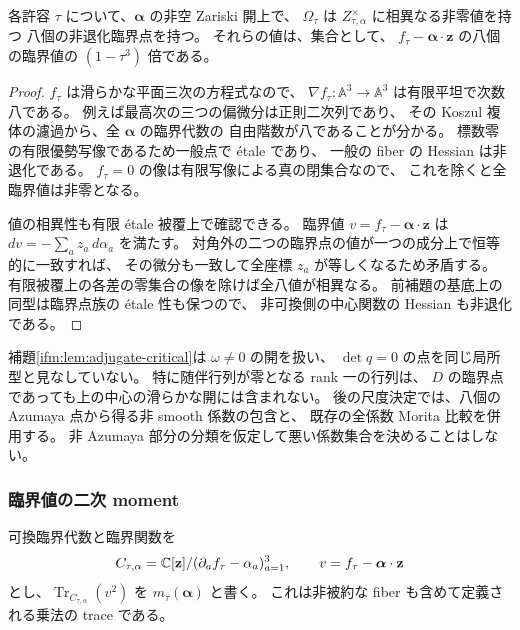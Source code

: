 \begin{corollary}
\label{ifm:cor:eight-morse}
各許容 $\tau$ について、$\boldsymbol\alpha$ の非空 Zariski 開上で、
$\Omega_\tau$ は $Z_{\tau,\alpha}^{\times}$ に相異なる非零値を持つ
八個の非退化臨界点を持つ。
それらの値は、集合として、
$f_\tau-\boldsymbol\alpha\cdot\mathbf z$ の八個の臨界値の
$(1-\tau^3)$ 倍である。
\end{corollary}

\begin{proof}
$f_\tau$ は滑らかな平面三次の方程式なので、
$\nabla f_\tau:\mathbb A^3\to\mathbb A^3$ は有限平坦で次数八である。
例えば最高次の三つの偏微分は正則二次列であり、
その Koszul 複体の濾過から、全 $\boldsymbol\alpha$ の臨界代数の
自由階数が八であることが分かる。
標数零の有限優勢写像であるため一般点で \'etale であり、
一般の fiber の Hessian は非退化である。
$f_\tau=0$ の像は有限写像による真の閉集合なので、
これを除くと全臨界値は非零となる。

値の相異性も有限 \'etale 被覆上で確認できる。
臨界値 $v=f_\tau-\boldsymbol\alpha\cdot\mathbf z$ は
$dv=-\sum_a z_a\,d\alpha_a$ を満たす。
対角外の二つの臨界点の値が一つの成分上で恒等的に一致すれば、
その微分も一致して全座標 $z_a$ が等しくなるため矛盾する。
有限被覆上の各差の零集合の像を除けば全八値が相異なる。
前補題の基底上の同型は臨界点族の \'etale 性も保つので、
非可換側の中心関数の Hessian も非退化である。
\end{proof}

\begin{remark}
\label{ifm:rem:nonazumaya}
補題\ref{ifm:lem:adjugate-critical}は $\omega\ne0$ の開を扱い、
$\det q=0$ の点を同じ局所型と見なしていない。
特に随伴行列が零となる rank 一の行列は、
$D$ の臨界点であっても上の中心の滑らかな開には含まれない。
後の尺度決定では、八個の Azumaya 点から得る非 smooth 係数の包含と、
既存の全係数 Morita 比較を併用する。
非 Azumaya 部分の分類を仮定して悪い係数集合を決めることはしない。
\end{remark}

\subsubsection{臨界値の二次 moment}

可換臨界代数と臨界関数を
\[
 C_{\tau,\alpha}
   =\mathbb C[\mathbf z]/(\partial_af_\tau-\alpha_a)_{a=1}^3,
 \qquad v=f_\tau-\boldsymbol\alpha\cdot\mathbf z
\]
とし、$\operatorname{Tr}_{C_{\tau,\alpha}}(v^2)$ を
$m_\tau(\boldsymbol\alpha)$ と書く。
これは非被約な fiber も含めて定義される乗法の trace である。

